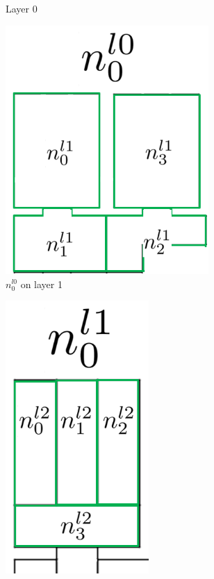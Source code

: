 \begin{figure}
\begin{subfigure}[b]{0.23\textwidth}
        \caption{Layer 0}
        \label{subfig:bigenvl0}
    \end{subfigure}
     \hfill
    \begin{subfigure}[b]{0.23\textwidth}
        \includegraphics[width=0.85\textwidth]{Report/images/Bild1c.png}
        \caption{$n_0^{l0}$ on layer 1}
        \label{subfig:bigenvl1}
    \end{subfigure}
     \hfill
    \begin{subfigure}[b]{0.23\textwidth}
        \includegraphics[width=0.6\textwidth]{Report/images/Bild1d.png}

\end{subfigure}
\end{figure}

